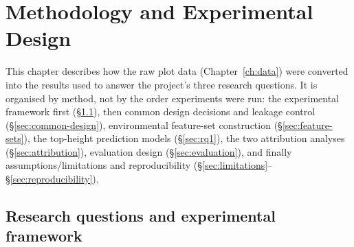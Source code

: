 
\chapter{Methodology and Experimental Design}
\label{ch:methodology}

This chapter describes how the raw plot data (Chapter~\ref{ch:data}) were converted into the
results used to answer the project's three research questions. It is organised by method, not by
the order experiments were run: the experimental framework first (\S\ref{sec:framework}), then
common design decisions and leakage control (\S\ref{sec:common-design}), environmental
feature-set construction (\S\ref{sec:feature-sets}), the top-height prediction models
(\S\ref{sec:rq1}), the two attribution analyses (\S\ref{sec:attribution}), evaluation design
(\S\ref{sec:evaluation}), and finally assumptions/limitations and reproducibility
(\S\ref{sec:limitations}--\S\ref{sec:reproducibility}).

\section{Research questions and experimental framework}
\label{sec:framework}



